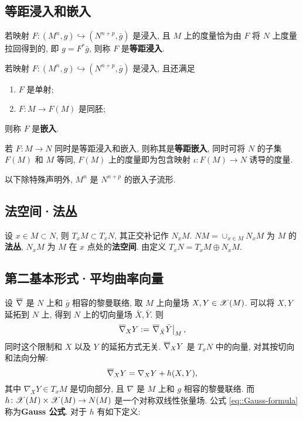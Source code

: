 \subsection{等距浸入和嵌入}
\begin{definition}[等距浸入]
	若映射 $F\colon (M^n, g) \hookrightarrow (N^{n + p}, \bar{g})$ 是浸入, 且 $M$ 上的度量恰为由 $F$ 将 $N$ 上度量拉回得到的, 即 $g = F^{\ast}\bar{g}$, 则称 $F$ 是{\bf 等距浸入}.
\end{definition}

\begin{definition}[嵌入]
	若映射 $F\colon (M^n, g) \hookrightarrow (N^{n + p}, \bar{g})$ 是浸入, 且还满足
	\begin{enumerate}
		\item $F$ 是单射;
		\item $F\colon M \rightarrow F(M)$ 是同胚;
	\end{enumerate}
	则称 $F$ 是{\bf 嵌入}.
\end{definition}

若 $F \colon M \rightarrow N$ 同时是等距浸入和嵌入, 则称其是{\bf 等距嵌入}, 同时可将 $N$ 的子集 $F(M)$ 和 $M$ 等同, $F(M)$ 上的度量即为包含映射 $\iota \colon F(M) \rightarrow N$ 诱导的度量.

以下除特殊声明外, $M^n$ 是 $N^{n + p}$ 的嵌入子流形.

\subsection{法空间·法丛}
\begin{definition}
	设 $x \in M \subset N$, 则 $T_xM \subset T_xN$, 其正交补记作 $N_xM$. $NM = \cup_{x \in M}N_xM$ 为 $M$ 的{\bf 法丛}, $N_xM$ 为 $M$ 在 $x$ 点处的{\bf 法空间}. 由定义 $T_xN = T_x{M} \oplus N_xM$.
\end{definition}

\subsection{第二基本形式·平均曲率向量}
设 $\overline{\nabla}$ 是 $N$ 上和 $\bar{g}$ 相容的黎曼联络, 取 $M$ 上向量场 $X, Y \in \mathscr{X}(M)$. 可以将 $X, Y$ 延拓到 $N$ 上, 得到 $N$ 上的切向量场 $\bar{X}, \bar{Y}$. 则
\begin{equation}\label{eq::restriction-of-bar-nabla}
	\overline{\nabla}_{X}Y := \left.\overline{\nabla}_{\bar{X}}\bar{Y}\right|_{M},
\end{equation}
同时这个限制和 $X$ 以及 $Y$ 的延拓方式无关. $\overline{\nabla}_{X}Y$ 是 $T_xN$ 中的向量, 对其按切向和法向分解:
\begin{equation}\label{eq::Gauss-formula}
	\overline{\nabla}_{X}Y = \nabla_XY + h(X, Y),
\end{equation}
其中 $\nabla_XY \in T_xM$ 是切向部分, 且 $\nabla$ 是 $M$ 上和 $g$ 相容的黎曼联络. 而 $h \colon \mathscr{X}(M) \times \mathscr{X}(M) \rightarrow N(M)$ 是一个对称双线性张量场. 公式 \ref{eq::Gauss-formula} 称为{\bf Gauss 公式}. 对于 $h$ 有如下定义:

